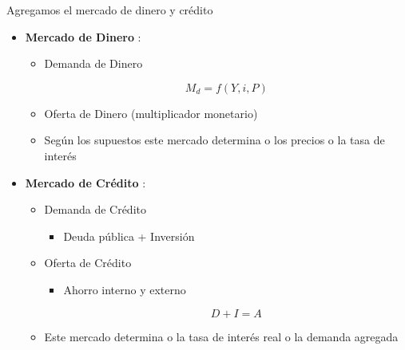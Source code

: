 \documentclass{beamer}
\begin{document}
\begin{frame}{Agregamos el mercado de dinero y crédito}

    \begin{itemize}
        \item \textbf{Mercado de Dinero} \faMoney:
            \begin{itemize}
            \item Demanda de Dinero
            
            \begin{center}
            \begin{boxA}
                    $$ M_{d} = f(Y, i, P) $$
             \end{boxA}
             \end{center}
            
            \item Oferta de Dinero (multiplicador monetario)
            \item Según los supuestos este mercado determina o los precios o la tasa de interés
            \end{itemize}
        
        \item \textbf{Mercado de Crédito} \faBank:
            \begin{itemize}
                \item Demanda de Crédito
                \begin{itemize}
                    \item Deuda pública + Inversión
                \end{itemize}
                \item Oferta de Crédito
                \begin{itemize}
                    \item Ahorro interno y externo

                    \begin{center}
                    \begin{tcolorbox}[width=2in, boxsep=0pt, left=0pt, right=0pt, top=0pt,]%
                            $$ D + I = A $$
                    \end{tcolorbox}
                    \end{center}
                \end{itemize}
                \item Este mercado determina o la tasa de interés real o la demanda agregada
            \end{itemize}
    \end{itemize}

\end{frame}
\end{document}
